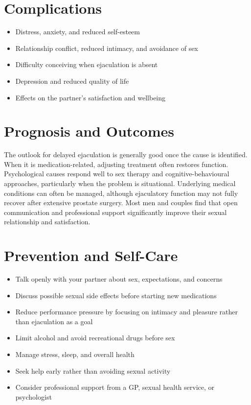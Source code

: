 \section*{Complications}
\begin{itemize}
    \item Distress, anxiety, and reduced self-esteem
    \item Relationship conflict, reduced intimacy, and avoidance of sex
    \item Difficulty conceiving when ejaculation is absent
    \item Depression and reduced quality of life
    \item Effects on the partner's satisfaction and wellbeing
\end{itemize}

\section*{Prognosis and Outcomes}
The outlook for delayed ejaculation is generally good once the cause is identified. When it is medication-related, adjusting treatment often restores function. Psychological causes respond well to sex therapy and cognitive-behavioural approaches, particularly when the problem is situational. Underlying medical conditions can often be managed, although ejaculatory function may not fully recover after extensive prostate surgery. Most men and couples find that open communication and professional support significantly improve their sexual relationship and satisfaction.

\section*{Prevention and Self-Care}
\begin{itemize}
    \item Talk openly with your partner about sex, expectations, and concerns
    \item Discuss possible sexual side effects before starting new medications
    \item Reduce performance pressure by focusing on intimacy and pleasure rather than ejaculation as a goal
    \item Limit alcohol and avoid recreational drugs before sex
    \item Manage stress, sleep, and overall health
    \item Seek help early rather than avoiding sexual activity
    \item Consider professional support from a GP, sexual health service, or psychologist
\end{itemize}

